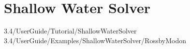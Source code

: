 \chapter{Shallow Water Solver}

3.4/UserGuide/Tutorial/ShallowWaterSolver
3.4/UserGuide/Examples/ShallowWaterSolver/RossbyModon
